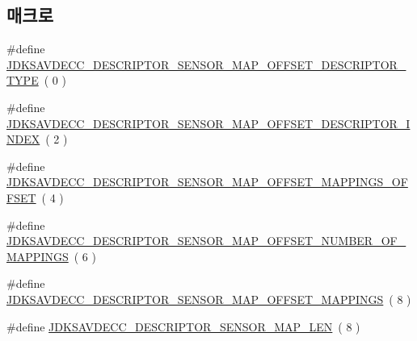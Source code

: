 \subsection*{매크로}
\begin{DoxyCompactItemize}
\item 
\#define \hyperlink{group__descriptor__sensor__map_ga6100388db4bc7ab6204380927335d655}{J\+D\+K\+S\+A\+V\+D\+E\+C\+C\+\_\+\+D\+E\+S\+C\+R\+I\+P\+T\+O\+R\+\_\+\+S\+E\+N\+S\+O\+R\+\_\+\+M\+A\+P\+\_\+\+O\+F\+F\+S\+E\+T\+\_\+\+D\+E\+S\+C\+R\+I\+P\+T\+O\+R\+\_\+\+T\+Y\+PE}~( 0 )
\item 
\#define \hyperlink{group__descriptor__sensor__map_ga37f3a3f7faecf126d1471fbc82c970f2}{J\+D\+K\+S\+A\+V\+D\+E\+C\+C\+\_\+\+D\+E\+S\+C\+R\+I\+P\+T\+O\+R\+\_\+\+S\+E\+N\+S\+O\+R\+\_\+\+M\+A\+P\+\_\+\+O\+F\+F\+S\+E\+T\+\_\+\+D\+E\+S\+C\+R\+I\+P\+T\+O\+R\+\_\+\+I\+N\+D\+EX}~( 2 )
\item 
\#define \hyperlink{group__descriptor__sensor__map_gaa03dc301996997600a02ad6ff890d3d4}{J\+D\+K\+S\+A\+V\+D\+E\+C\+C\+\_\+\+D\+E\+S\+C\+R\+I\+P\+T\+O\+R\+\_\+\+S\+E\+N\+S\+O\+R\+\_\+\+M\+A\+P\+\_\+\+O\+F\+F\+S\+E\+T\+\_\+\+M\+A\+P\+P\+I\+N\+G\+S\+\_\+\+O\+F\+F\+S\+ET}~( 4 )
\item 
\#define \hyperlink{group__descriptor__sensor__map_gaefb6504af0fc602e502e00236ab7ac70}{J\+D\+K\+S\+A\+V\+D\+E\+C\+C\+\_\+\+D\+E\+S\+C\+R\+I\+P\+T\+O\+R\+\_\+\+S\+E\+N\+S\+O\+R\+\_\+\+M\+A\+P\+\_\+\+O\+F\+F\+S\+E\+T\+\_\+\+N\+U\+M\+B\+E\+R\+\_\+\+O\+F\+\_\+\+M\+A\+P\+P\+I\+N\+GS}~( 6 )
\item 
\#define \hyperlink{group__descriptor__sensor__map_gae8c9fd789233e191f9c2cc28fcdf99f8}{J\+D\+K\+S\+A\+V\+D\+E\+C\+C\+\_\+\+D\+E\+S\+C\+R\+I\+P\+T\+O\+R\+\_\+\+S\+E\+N\+S\+O\+R\+\_\+\+M\+A\+P\+\_\+\+O\+F\+F\+S\+E\+T\+\_\+\+M\+A\+P\+P\+I\+N\+GS}~( 8 )
\item 
\#define \hyperlink{group__descriptor__sensor__map_ga4eeb103a929997c905f5bc7233926d5f}{J\+D\+K\+S\+A\+V\+D\+E\+C\+C\+\_\+\+D\+E\+S\+C\+R\+I\+P\+T\+O\+R\+\_\+\+S\+E\+N\+S\+O\+R\+\_\+\+M\+A\+P\+\_\+\+L\+EN}~( 8 )
\end{DoxyCompactItemize}
